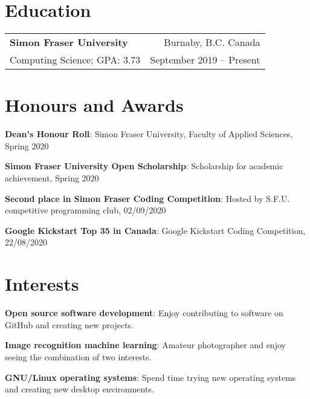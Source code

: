 \documentclass[letterpaper, 11pt]{article}
\makeatletter
\newcommand{\resumeItem}[2]{
  \small{
    \textbf{#1}{: #2 \vspace{5pt}} \\
  }
}
\newcommand{\resumeEducationHeading}[4]{
  \vspace{-1pt}
    \begin{tabular*}{0.97\textwidth}[t]{l@{\extracolsep{\fill}}r}
      \textbf{#1} & #2 \\
      \small#3 & \small #4 \\
    \end{tabular*}\vspace{-5pt}
}
\makeatother
\begin{document}
\section{Education}
    \resumeEducationHeading
      {Simon Fraser University}{Burnaby, B.C. Canada}
      {Computing Science;  GPA: 3.73}{September 2019 -- Present}

\section{Honours and Awards}
    \resumeItem{Dean's Honour Roll}
	{Simon Fraser University, Faculty of Applied Sciences, Spring 2020}
    \resumeItem{Simon Fraser University Open Scholarship}
	{Scholarship for academic achievement, Spring 2020}
    \resumeItem{Second place in Simon Fraser Coding Competition}
	{Hosted by S.F.U. competitive programming club, 02/09/2020}
    \resumeItem{Google Kickstart Top 35 in Canada}
	{Google Kickstart Coding Competition, 22/08/2020}

\section{Interests}
    \resumeItem{Open source software development}
    {Enjoy contributing to software on GitHub and creating new projects.}
    \resumeItem{Image recognition machine learning}
    {Amateur photographer and enjoy seeing the combination of two interests.}
    \resumeItem{GNU/Linux operating systems}
    {Spend time trying new operating systems and creating new desktop environments.}
\end{document}
